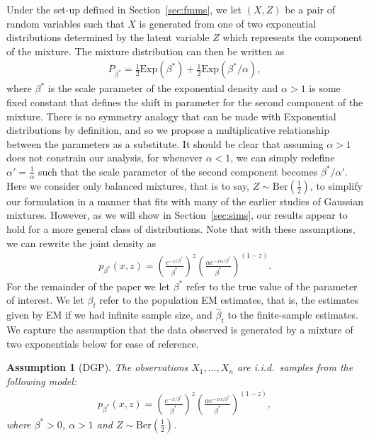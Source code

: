 \documentclass[runningheads]{llncs}
\newtheorem{assumption}[theorem]{Assumption}
\begin{document}
Under the set-up defined in Section~\ref{sec:fmms}, we let $(X,Z)$ be a pair of
random variables such that $X$ is generated from one of two exponential
distributions determined by the latent variable $Z$ which represents the
component of the mixture. The mixture distribution can then be written as
\begin{align}
  \label{eq:mix_dens}
  P_{\beta^*} = \frac{1}{2} \text{Exp}(\beta^*) + \frac{1}{2}\text{Exp}(\beta^*/\alpha ),
\end{align}
where $\beta^*$ is the scale parameter of the exponential density and
$\alpha >1$ is some fixed constant that defines the shift in parameter for the
second component of the mixture. There is no symmetry analogy that can be made
with Exponential distributions by definition, and so we propose a multiplicative
relationship between the parameters as a substitute.
It should be clear that assuming $\alpha > 1$ does not constrain our
analysis, for whenever $\alpha < 1$, we can simply redefine $\alpha' =
\frac{1}{\alpha}$ such that the scale parameter of the second component becomes
$\beta^*/\alpha'$. Here we consider only balanced mixtures, that is to say, $Z \sim
\text{Ber}(\frac{1}{2})$, to simplify our formulation in a manner that fits with
many of the earlier studies of Gaussian mixtures. However, as we will show in
Section~\ref{sec:sims}, our results appear to hold for a more general class of distributions.
Note that with these assumptions, we can rewrite the joint density as
\begin{align}
  \label{eq:mix_density}
  p_{\beta^*}(x,z) =
  \left(\frac{e^{-x/\beta^*}}{\beta^*}\right)^{z}
  \left( \frac{\alpha e^{-x\alpha/\beta^*}}{\beta^*} \right)^{(1-z)}.
\end{align}
For the remainder of the paper we let $\beta^*$ refer to the true value of the
parameter of interest. We let $\beta_t$ refer to the population EM
estimates, that is, the estimates given by EM if we had infinite sample size,
and $\hat{\beta}_t$ to the finite-sample estimates.
We capture the assumption that the data observed is generated by a mixture of
two exponentials below for ease of reference.
\begin{assumption}[DGP]
  \label{as:dgp}
  The observations $X_1, \ldots, X_n$ are i.i.d.\ samples from
  the following model:
\begin{align*}
  p_{\beta^*}(x,z) =
  \left(\frac{e^{-x/\beta^*}}{\beta^*}\right)^{z}
  \left( \frac{\alpha e^{-x\alpha/\beta^*}}{\beta^*} \right)^{(1-z)},
\end{align*}
where $\beta^*>0$, $\alpha >1$ and $Z \sim \text{Ber}(\frac{1}{2})$.
\end{assumption}
\end{document}
